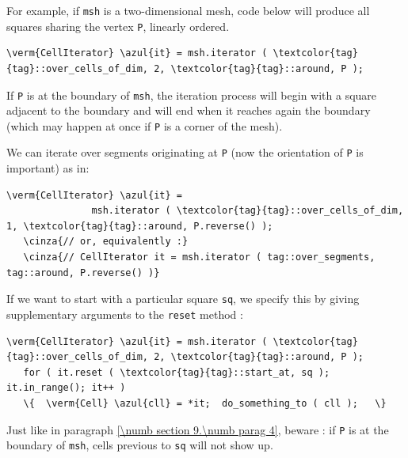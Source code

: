 For example, if {\small\tt msh} is a two-dimensional mesh, code below will produce
all squares sharing the vertex {\small\tt P}, linearly ordered.

\begin{Verbatim}[commandchars=\\\{\},formatcom=\small\tt,
   baselinestretch=0.94,framesep=2mm                      ]
   \verm{CellIterator} \azul{it} = msh.iterator ( \textcolor{tag}{tag}::over_cells_of_dim, 2, \textcolor{tag}{tag}::around, P );
\end{Verbatim}

If {\small\tt P} is at the boundary of {\small\tt msh}, the iteration process will begin
with a square adjacent to the boundary and will end when it reaches again the boundary
(which may happen at once if {\small\tt P} is a corner of the mesh).

We can iterate over segments originating at {\small\tt P} (now the orientation of
{\small\tt P} is important) as in:

\begin{Verbatim}[commandchars=\\\{\},formatcom=\small\tt,
   baselinestretch=0.94,framesep=2mm                      ]
   \verm{CellIterator} \azul{it} = 
               msh.iterator ( \textcolor{tag}{tag}::over_cells_of_dim, 1, \textcolor{tag}{tag}::around, P.reverse() );
   \cinza{// or, equivalently :}
   \cinza{// CellIterator it = msh.iterator ( tag::over_segments, tag::around, P.reverse() )}
\end{Verbatim}

If we want to start with a particular square {\small\tt sq}, we specify this by giving
supplementary arguments to the {\small\tt reset} method :

\begin{Verbatim}[commandchars=\\\{\},formatcom=\small\tt,
   baselinestretch=0.94,framesep=2mm                      ]
   \verm{CellIterator} \azul{it} = msh.iterator ( \textcolor{tag}{tag}::over_cells_of_dim, 2, \textcolor{tag}{tag}::around, P );
   for ( it.reset ( \textcolor{tag}{tag}::start_at, sq ); it.in_range(); it++ )
   \{  \verm{Cell} \azul{cll} = *it;  do_something_to ( cll );   \}
\end{Verbatim}

Just like in paragraph \ref{\numb section 9.\numb parag 4}, beware : if {\small\tt P}
is at the boundary of {\small\tt msh}, cells previous to {\small\tt sq} will not
show up.

